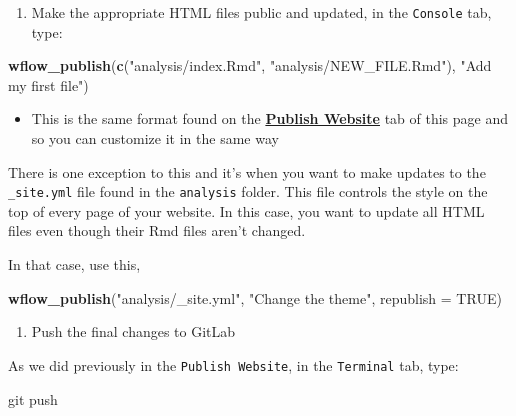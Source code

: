 \documentclass[openany]{article}
\newenvironment{Shaded}{\begin{snugshade}}{\end{snugshade}}
\newcommand{\DataTypeTok}[1]{\textcolor[rgb]{0.13,0.29,0.53}{#1}}
\newcommand{\KeywordTok}[1]{\textcolor[rgb]{0.13,0.29,0.53}{\textbf{#1}}}
\newcommand{\NormalTok}[1]{#1}
\newcommand{\OtherTok}[1]{\textcolor[rgb]{0.56,0.35,0.01}{#1}}
\newcommand{\StringTok}[1]{\textcolor[rgb]{0.31,0.60,0.02}{#1}}
\providecommand{\tightlist}{%
  \setlength{\itemsep}{0pt}\setlength{\parskip}{0pt}}
\begin{document}
\begin{enumerate}
\def\labelenumi{\arabic{enumi}.}
\setcounter{enumi}{1}
\tightlist
\item
  Make the appropriate HTML files public and updated, in the \texttt{Console} tab, type:
\end{enumerate}

\begin{Shaded}
\begin{Highlighting}[]
\KeywordTok{wflow_publish}\NormalTok{(}\KeywordTok{c}\NormalTok{(}\StringTok{"analysis/index.Rmd"}\NormalTok{, }\StringTok{"analysis/NEW_FILE.Rmd"}\NormalTok{), }\StringTok{"Add my first file"}\NormalTok{)}
\end{Highlighting}
\end{Shaded}

\begin{itemize}
\tightlist
\item
  This is the same format found on the \protect\hyperlink{publish-website}{\textbf{Publish Website}} tab of this page and so you can customize it in the same way
\end{itemize}

There is one exception to this and it's when you want to make updates to the \texttt{\_site.yml} file found in the \texttt{analysis} folder. This file controls the style on the top of every page of your website. In this case, you want to update all HTML files even though their Rmd files aren't changed.

In that case, use this,

\begin{Shaded}
\begin{Highlighting}[]
\KeywordTok{wflow_publish}\NormalTok{(}\StringTok{"analysis/_site.yml"}\NormalTok{, }\StringTok{"Change the theme"}\NormalTok{, }\DataTypeTok{republish =} \OtherTok{TRUE}\NormalTok{)}
\end{Highlighting}
\end{Shaded}

\begin{enumerate}
\def\labelenumi{\arabic{enumi}.}
\setcounter{enumi}{2}
\tightlist
\item
  Push the final changes to GitLab
\end{enumerate}

As we did previously in the \texttt{Publish\ Website}, in the \texttt{Terminal} tab, type:

\begin{Shaded}
\begin{Highlighting}[]
\NormalTok{git push}
\end{Highlighting}
\end{Shaded}
\end{document}
